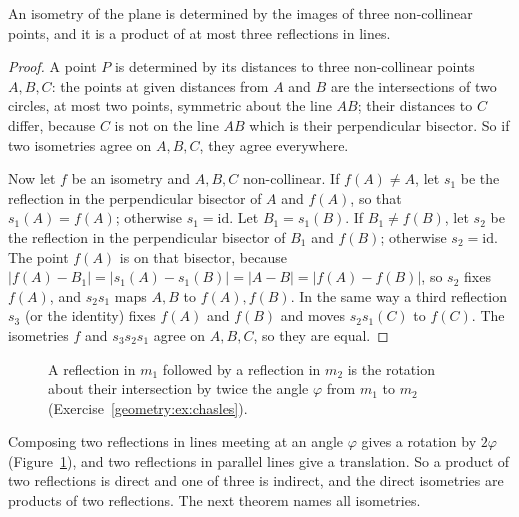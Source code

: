 \begin{theorem}\label{geometry:thm:threereflections}
An isometry of the plane is determined by the images of three non-collinear points, and it is a product of at most three
reflections in lines.
\end{theorem}
\begin{proof}
A point $P$ is determined by its distances to three non-collinear points $A,B,C$: the points at given distances from $A$ and $B$ are the
intersections of two circles, at most two points, symmetric about the line $AB$; their distances to $C$ differ, because $C$ is not on
the line $AB$ which is their perpendicular bisector. So if two isometries agree on $A,B,C$, they agree everywhere.

Now let $f$ be an isometry and $A,B,C$ non-collinear. If $f(A)\ne A$, let $s_1$ be the reflection in the perpendicular bisector of
$A$ and $f(A)$, so that $s_1(A)=f(A)$; otherwise $s_1=\mathrm{id}$. Let $B_1=s_1(B)$. If $B_1\ne f(B)$, let $s_2$ be the reflection in the
perpendicular bisector of $B_1$ and $f(B)$; otherwise $s_2=\mathrm{id}$. The point $f(A)$ is on that bisector, because
$|f(A)-B_1|=|s_1(A)-s_1(B)|=|A-B|=|f(A)-f(B)|$, so $s_2$ fixes $f(A)$, and $s_2s_1$ maps $A,B$ to $f(A),f(B)$. In the same way a third
reflection $s_3$ (or the identity) fixes $f(A)$ and $f(B)$ and moves $s_2s_1(C)$ to $f(C)$. The isometries $f$ and $s_3s_2s_1$ agree on
$A,B,C$, so they are equal.
\end{proof}

\begin{figure}[ht]
\centering
{}
\caption{A reflection in $m_1$ followed by a reflection in $m_2$ is the rotation about their intersection by twice the angle
$\varphi$ from $m_1$ to $m_2$ (Exercise~\ref{geometry:ex:chasles}).}
\label{geometry:fig:tworeflections}
\end{figure}

Composing two reflections in lines meeting at an angle $\varphi$ gives a rotation by $2\varphi$ (Figure~\ref{geometry:fig:tworeflections}), and
two reflections in parallel lines give a translation. So a product of two reflections is direct and one of three is indirect, and
the direct isometries are products of two reflections. The next theorem names all isometries.

